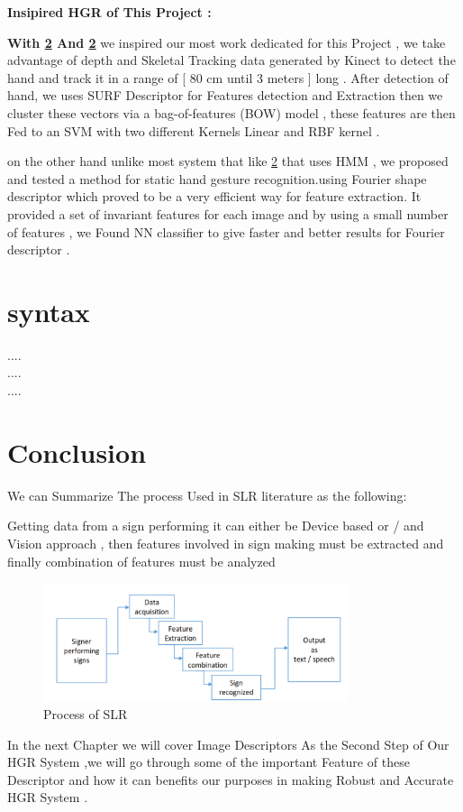 \textbf{ Insipired HGR of This Project : }


\textbf{With \ref{} And \ref{} } we inspired our most work dedicated for this Project , we take advantage of  depth and Skeletal Tracking  data generated by Kinect to detect the hand and track it  in a range of [ 80 cm until 3 meters ] long  .
After detection of hand, we uses SURF Descriptor for Features detection and Extraction then we  cluster these vectors via a bag-of-features (BOW) model , these features are then Fed to an SVM with two different Kernels Linear and RBF kernel .

on the other hand unlike most system that like \ref{} that uses HMM ,  we proposed and tested a method for static hand gesture recognition.using  Fourier shape  descriptor which proved to be a very efficient way for feature extraction. It provided a set of invariant features for each image and by using a small number of features , we Found NN classifier to give faster and better results for Fourier descriptor .


\section{syntax}

....
\\
....
\\
....



\section{Conclusion}

We can Summarize The process Used in SLR literature as the following:

Getting data from a sign performing  it can either be Device based or / and Vision approach , then features
involved in sign making must be extracted and finally combination of features must be analyzed 

\begin{figure}[H]
\centering
\includegraphics[width=0.8\textwidth]{img/SLR.PNG}
\caption{  Process of SLR }
\label{fig:SLR}
\end{figure}

In the next Chapter we will cover Image Descriptors As the Second Step of Our HGR System ,we will go through some of the important Feature of these Descriptor and how it can benefits our purposes in making Robust and Accurate HGR System . 